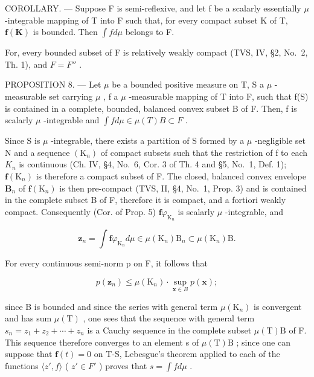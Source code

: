 COROLLARY. --- Suppose F is semi-reflexive, and let f be a scalarly essentially \(\mu\) -integrable mapping of T into F such that, for every compact subset K of T, \(\mathbf{f}(\mathbf{K})\) is bounded. Then \(\int f d\mu\) belongs to F.

For, every bounded subset of F is relatively weakly compact (TVS, IV, §2, No.~2, Th. 1), and \(F = F''\) .

PROPOSITION 8. --- Let \(\mu\) be a bounded positive measure on T, S a \(\mu\) -measurable set carrying \(\mu\) , f a \(\mu\) -measurable mapping of T into F, such that f(S) is contained in a complete, bounded, balanced convex subset B of F. Then, f is scalarly \(\mu\) -integrable and \(\int f d\mu \in \mu(T)B \subset F\) .

Since S is \(\mu\) -integrable, there exists a partition of S formed by a \(\mu\) -negligible set N and a sequence \((\mathrm{K}_{n})\) of compact subsets such that the restriction of f to each \(K_{n}\) is continuous (Ch. IV, §4, No.~6, Cor. 3 of Th. 4 and §5, No.~1, Def. 1); \(\mathbf{f}(\mathrm{K}_n)\) is therefore a compact subset of F. The closed, balanced convex envelope \(\mathbf{B}_n\) of \(\mathbf{f}(\mathrm{K}_n)\) is then pre-compact (TVS, II, §4, No.~1, Prop. 3) and is contained in the complete subset B of F, therefore it is compact, and a fortiori weakly compact. Consequently (Cor. of Prop. 5) \(\mathbf{f}\varphi_{\mathrm{K}_n}\) is scalarly \(\mu\) -integrable, and

\[
\mathbf {z} _ {n} = \int \mathbf {f} \varphi_ {\mathrm{K} _ {n}} d \mu \in \mu (\mathrm{K} _ {n}) \mathrm{B} _ {n} \subset \mu (\mathrm{K} _ {n}) \mathrm{B}.
\]

For every continuous semi-norm p on F, it follows that

\[
p (\mathbf {z} _ {n}) \leqslant \mu (\mathrm{K} _ {n}) \cdot \sup _ {\mathbf {x} \in B} p (\mathbf {x});
\]

since B is bounded and since the series with general term \(\mu(\mathrm{K}_{n})\) is convergent and has sum \(\mu(\mathrm{T})\) , one sees that the sequence with general term \(s_{n}=z_{1}+z_{2}+\cdots+z_{n}\) is a Cauchy sequence in the complete subset \(\mu(\mathrm{T})\mathrm{B}\) of F. This sequence therefore converges to an element s of \(\mu(\mathrm{T})\mathrm{B}\) ; since one can suppose that \(\mathbf{f}(t)=0\) on T-S, Lebesgue's theorem applied to each of the functions \(\langle z', f\rangle\) ( \(z'\in F'\) ) proves that \(s=\int f d\mu\) .
\relax{}
